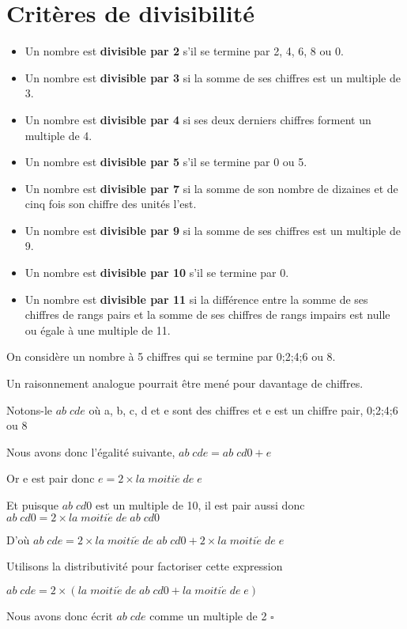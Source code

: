 \section{Critères de divisibilité}
\begin{propriete}[\admise]	
	\begin{itemize}
		\item Un nombre est \textbf{divisible par 2} s'il se termine par 2, 4, 6, 8 ou 0.
		\item Un nombre est \textbf{divisible par 3} si la somme de ses chiffres est un multiple de 3.
		\item Un nombre est \textbf{divisible par 4} si ses deux derniers chiffres forment un multiple de 4.
		\item Un nombre est \textbf{divisible par 5} s'il se termine par 0 ou 5.
		\item Un nombre est \textbf{divisible par 7} si la somme de son nombre de dizaines et de cinq fois son chiffre des unités l'est.
		\item Un nombre est \textbf{divisible par 9} si la somme de ses chiffres est un multiple de 9.
		\item Un nombre est \textbf{divisible par 10} s'il se termine par 0.
		\item Un nombre est \textbf{divisible par 11} si la différence entre la somme de ses chiffres de rangs pairs et
	la somme de ses chiffres de rangs impairs est nulle ou égale à une multiple de 11.
	\end{itemize}
\end{propriete}
\renewcommand{\StringPREUVE}{\textsc{Idée de la preuve du critère de divisibilité par 2}}
\begin{preuve}

	On considère un nombre à 5 chiffres qui se termine par 0;2;4;6 ou 8.

	Un raisonnement analogue pourrait être mené pour davantage de chiffres.
	
	Notons-le $ab\;cde$ où a, b, c, d et e sont des chiffres et e est un chiffre pair, 0;2;4;6 ou 8
	
	Nous avons donc l'égalité suivante, $ab\;cde = ab\;cd0 + e$

	Or e est pair donc $e = 2\times la\;moiti\acute{e}\;de\;e$

	Et puisque $ab\;cd0$ est un multiple de 10, il est pair aussi donc $ab\;cd0 = 2\times la\;moiti\acute{e}\;de\;ab\;cd0$	
	
	D'où $ab\;cde = 2\times la\;moiti\acute{e}\;de\;ab\;cd0 + 2\times la\;moiti\acute{e}\;de\;e$
		
	Utilisons la distributivité pour factoriser cette expression

	$ab\;cde = 2\times (la\;moiti\acute{e}\;de\;ab\;cd0 + la\;moiti\acute{e}\;de\;e)$
	
	Nous avons donc écrit $ab\;cde$ comme un multiple de 2 $\square$	
\end{preuve}
\renewcommand{\StringPREUVE}{PREUVE}

